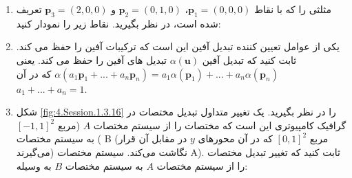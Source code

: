 {\begin{spacing}{1.5}
\begin{enumerate}[label=\textbf{\arabic*}.]
            \item {
                مثلثی را که با نقاط $\textbf{p}_{1}=(0,0,0)$، $\textbf{p}_{2}=(0,1,0)$ و $\textbf{p}_{3}=(2,0,0)$ تعریف شده است، در نظر بگیرید. نقاط زیر را نمودار کنید:
                 \textbf{\vspace{-6pt}}
            }

            \item {یکی از عوامل تعیین کننده تبدیل آفین این است که ترکیبات آفین را حفظ می کند.
            ثابت کنید که تبدیل آفین $\alpha(\textbf{u})$ تبدیل های آفین را حفظ می کند.
            یعنی $\alpha(a_{1}\textbf{p}_{1}+...+a_{n}\textbf{p}_{n})=a_{1}\alpha(\textbf{p}_{1})+...+a_{n}\alpha(\textbf{p}_{n})$ که در آن $a_{1}+...+a_{n}=1$.}

            \item {
                شکل \ref{fig:4.Session.1.3.16} را در نظر بگیرید.
                یک تغییر متداول تبدیل مختصات در گرافیک کامپیوتری این است که مختصات را از سیستم مختصات $A$ (مربع $[-1,1]^{2}$) به سیستم مختصات B (مربع $[0,1]^{2}$ که در آن محورهای $y$ در مقابل آن قرار می‌گیرند) نگاشت می‌کند. سیستم مختصات A).
                ثابت کنید که تغییر تبدیل مختصات را از سیستم مختصات $A$ به سیستم مختصات $B$ به وسیله:

}
\end{enumerate}
\end{spacing}}
